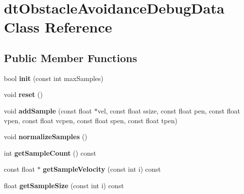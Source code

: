 \hypertarget{classdtObstacleAvoidanceDebugData}{}\section{dt\+Obstacle\+Avoidance\+Debug\+Data Class Reference}
\label{classdtObstacleAvoidanceDebugData}
\subsection*{Public Member Functions}
\begin{DoxyCompactItemize}
\item 
\mbox{\label{classdtObstacleAvoidanceDebugData_a49f4c177709ecccc77331e1b43ae893c}} 
bool {\bfseries init} (const int max\+Samples)
\item 
\mbox{\label{classdtObstacleAvoidanceDebugData_a2e7d802ea941ad37d5244af91c47f0c9}} 
void {\bfseries reset} ()
\item 
\mbox{\label{classdtObstacleAvoidanceDebugData_a54b01ec0a47c6efd95ebde459791b788}} 
void {\bfseries add\+Sample} (const float $\ast$vel, const float ssize, const float pen, const float vpen, const float vcpen, const float spen, const float tpen)
\item 
\mbox{\label{classdtObstacleAvoidanceDebugData_aae878af7168a5683cf05cd6f3f9b4cfe}} 
void {\bfseries normalize\+Samples} ()
\item 
\mbox{\label{classdtObstacleAvoidanceDebugData_a48f21bd0b2d2f591290e127b00953ec2}} 
int {\bfseries get\+Sample\+Count} () const
\item 
\mbox{\label{classdtObstacleAvoidanceDebugData_a682696e8fc9185544690fe3391c9b613}} 
const float $\ast$ {\bfseries get\+Sample\+Velocity} (const int i) const
\item 
\mbox{\label{classdtObstacleAvoidanceDebugData_a87816c09e68ea4d93a01b54b2b5025b1}} 
float {\bfseries get\+Sample\+Size} (const int i) const
\item 

\end{DoxyCompactItemize}
